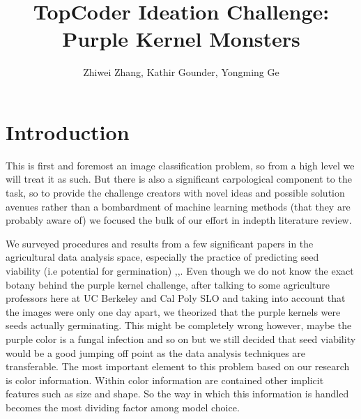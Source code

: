 \documentclass[letterpaper, 10 pt, conference]{ieeeconf}  %
\title{\LARGE \bf
TopCoder Ideation Challenge: Purple Kernel Monsters
}
\author{Zhiwei Zhang, Kathir Gounder, Yongming Ge %
}
\begin{document}
\maketitle
\thispagestyle{empty}
\pagestyle{empty}

\section{Introduction}

This is first and foremost an image classification problem, so from a high level we will treat it as such. But there is also a significant carpological component to the task, so to provide the challenge creators with novel ideas and possible solution avenues rather than a bombardment of machine learning methods (that they are probably aware of) we focused the bulk of our effort in indepth literature review.  

We surveyed procedures and results from a few significant papers in the agricultural data analysis space, especially the practice of predicting seed viability (i.e potential for germination) \cite{DBLP:journals/cea/PrzybyloJ19},\cite{Jablonski2016ColourBasedBD},\cite{liao2018hyperspectral}. Even though we do not know the exact botany behind the purple kernel challenge, after talking to some agriculture professors here at UC Berkeley and Cal Poly SLO and taking into account that the images were only one day apart, we theorized that the purple kernels were seeds actually germinating. This might be completely wrong however, maybe the purple color is a fungal infection and so on but we still decided that seed viability would be a good jumping off point as the data analysis techniques are transferable. The most important element to this problem based on our research is color information. Within color information are contained other implicit features such as size and shape. So the way in which this information is handled becomes the most dividing factor among model choice. 
\end{document}

